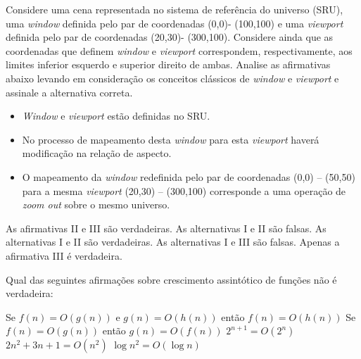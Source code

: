 \documentclass[12pt, addpoints]{exam}
\begin{document}
    \begin{questions}

    \newpage
    \question

Considere uma cena representada no sistema de referência do universo (SRU), uma \textit{window} definida pelo par de coordenadas (0,0)- (100,100) e uma \textit{viewport} definida pelo par de coordenadas (20,30)- (300,100). Considere ainda que as coordenadas que definem \textit{window} e \textit{viewport} correspondem, respectivamente, aos limites inferior esquerdo e superior direito de ambas. Analise as afirmativas abaixo levando em consideração os conceitos clássicos de \textit{window} e \textit{viewport} e assinale a alternativa correta.



\begin{itemize}

    \item[I)] \textit{Window} e \textit{viewport} estão definidas no SRU.

    \item[II)] No processo de mapeamento desta \textit{window} para esta \textit{viewport} haverá modificação na relação de aspecto.

    \item[III)] O mapeamento da \textit{window} redefinida pelo par de coordenadas (0,0) – (50,50) para a mesma \textit{viewport} (20,30) – (300,100) corresponde a uma operação de \textit{zoom out} sobre o mesmo universo.

\end{itemize}
\begin{choices}
\choice As afirmativas II e III são verdadeiras.
\choice As alternativas I e II são falsas.
\choice As alternativas I e II são verdadeiras.
\choice As alternativas I e III são falsas.
\choice Apenas a afirmativa III é verdadeira.
\end{choices}

\question

Qual das seguintes afirmações sobre crescimento assintótico de funções não é verdadeira:
\begin{choices}
\choice Se \( f(n) = O(g(n)) \) e \( g(n) = O(h(n)) \) então \( f(n) = O(h(n)) \)
\choice Se \( f(n) = O(g(n)) \) então \( g(n) = O(f(n)) \)
\choice \( 2^{n+1} = O(2^n) \)
\choice \( 2n^2 + 3n + 1 = O(n^2) \)
\choice \( \log n^2 = O(\log n) \)
\end{choices}


\end{questions}
\end{document}
